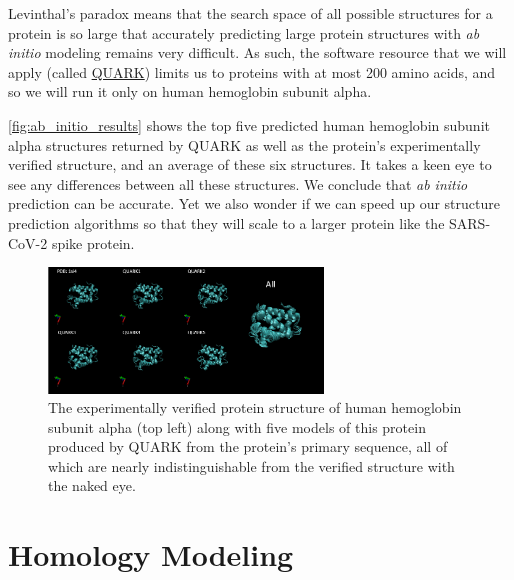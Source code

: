 Levinthal's paradox means that the search space of all possible structures for a protein is so large that accurately predicting large protein structures with \textit{ab initio} modeling remains very difficult. As such, the software resource that we will apply (called \href{https://zhanglab.ccmb.med.umich.edu/QUARK/}{QUARK}) limits us to proteins with at most 200 amino acids, and so we will run it only on human hemoglobin subunit alpha.

\autoref{fig:ab_initio_results} shows the top five predicted human hemoglobin subunit alpha structures returned by QUARK as well as the protein's experimentally verified structure, and an average of these six structures. It takes a keen eye to see any differences between all these structures. We conclude that \textit{ab initio} prediction can be accurate. Yet we also wonder if we can speed up our structure prediction algorithms so that they will scale to a larger protein like the SARS-CoV-2 spike protein.\\

\begin{figure}[h]
	\centering
	\mySfFamily
	\includegraphics[width = 0.65\textwidth]{../images/ab_initio_results.png}
	\caption{The experimentally verified protein structure of human hemoglobin subunit alpha (top left) along with five models of this protein produced by QUARK from the protein's primary sequence, all of which are nearly indistinguishable from the verified structure with the naked eye.}
	\label{fig:ab_initio_results}
\end{figure}


\FloatBarrier
{}

\section{Homology Modeling}
\label{sec:homology}
